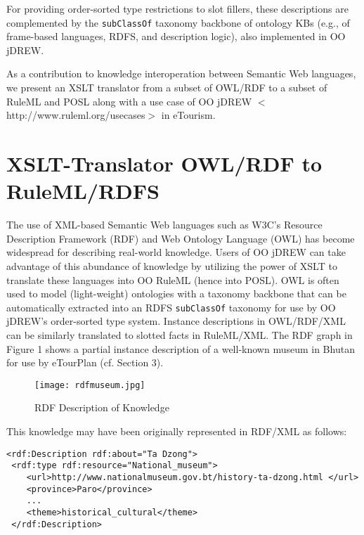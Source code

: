 \documentclass [letterpaper] {Article}
\begin{document}
\begin{small}
\hspace{0.3in}For providing order-sorted type restrictions to slot fillers, these descriptions are complemented by the {\tt subClassOf} taxonomy backbone of ontology KBs (e.g., of frame-based languages, RDFS, and description logic), also implemented in OO jDREW. 

\hspace{0.3in}As a contribution to knowledge interoperation between Semantic Web languages, we present an XSLT translator from a subset of OWL/RDF to a subset of RuleML and POSL along with a use case of OO jDREW \linebreak
$<$http://www.ruleml.org/usecases$>$ in eTourism.


\section{XSLT-Translator OWL/RDF to RuleML/RDFS} 

\hspace{0.3in}The use of XML-based Semantic Web languages such as W3C's Resource Description Framework (RDF) and Web Ontology Language (OWL) has become widespread for describing real-world knowledge. Users of OO jDREW can take advantage of this abundance of knowledge by utilizing the power of XSLT to translate these languages into OO RuleML (hence into POSL). OWL is often used to model (light-weight) ontologies with a taxonomy backbone that can be automatically extracted into an RDFS {\tt subClassOf} taxonomy for use by OO jDREW's order-sorted type system. Instance descriptions in OWL/RDF/XML can be similarly translated to slotted facts in RuleML/XML. The RDF graph in Figure 1 shows a partial instance description of a
well-known museum in Bhutan for use by eTourPlan (cf. Section 3). 

\begin{figure}
\begin{center}
\texttt{[image: rdfmuseum.jpg]}
\caption {RDF Description of Knowledge}
\label{fig:Fig4}
\end{center}
\end{figure}

\hspace{0.1in}This knowledge may have been originally represented in RDF/XML as follows:
 
\begin{small}
\singlespacing
\begin{verbatim}
<rdf:Description rdf:about="Ta Dzong">
 <rdf:type rdf:resource="National_museum">
    <url>http://www.nationalmuseum.gov.bt/history-ta-dzong.html </url> 
    <province>Paro</province>
    ...
    <theme>historical_cultural</theme>
 </rdf:Description>
 \end{verbatim}
 \end{small}
 


\end{small}
\end{document}
